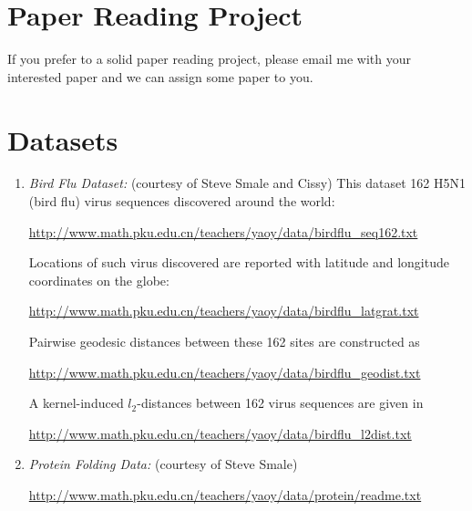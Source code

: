 \documentclass[11pt]{article}
\begin{document}
\section{Paper Reading Project}

If you prefer to a solid paper reading project, please email me with your interested paper and we can assign some paper to you.  




\section*{Datasets}

\begin{enumerate}

\item {\em Bird Flu Dataset:} (courtesy of Steve Smale and Cissy) This dataset 162 H5N1 (bird flu) virus sequences discovered around the world:

\url{http://www.math.pku.edu.cn/teachers/yaoy/data/birdflu_seq162.txt} 

Locations of such virus discovered are reported with latitude and longitude coordinates on the globe:

\url{http://www.math.pku.edu.cn/teachers/yaoy/data/birdflu_latgrat.txt} 

Pairwise geodesic distances between these 162 sites are constructed as  

\url{http://www.math.pku.edu.cn/teachers/yaoy/data/birdflu_geodist.txt}

A kernel-induced $l_2$-distances between 162 virus sequences are given in 

\url{http://www.math.pku.edu.cn/teachers/yaoy/data/birdflu_l2dist.txt}

\item{\em Protein Folding Data:} (courtesy of Steve Smale) 

\url{http://www.math.pku.edu.cn/teachers/yaoy/data/protein/readme.txt} 



\end{enumerate}
\end{document}
